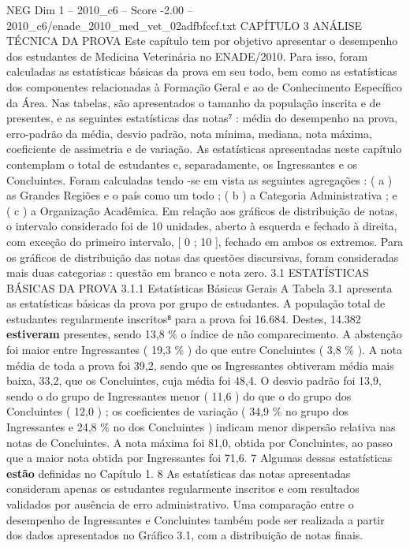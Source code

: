 \begin{textsample}{NEG Dim 1 – 2010\_c6 – Score -2.00 – 2010\_c6/enade\_2010\_med\_vet\_02adfbfccf.txt}  \label{ex:f1_neg_277}
CAPÍTULO 3 ANÁLISE TÉCNICA DA PROVA Este capítulo tem por objetivo apresentar o desempenho dos estudantes de Medicina Veterinária no ENADE/2010.
Para isso, foram calculadas as estatísticas básicas da prova em seu todo, bem como as estatísticas dos componentes relacionadas à Formação Geral e ao de Conhecimento Específico da Área.
Nas tabelas, são apresentados o tamanho da população inscrita e de presentes, e as seguintes estatísticas das notas⁷ : média do desempenho na prova, erro-padrão da média, desvio padrão, nota mínima, mediana, nota máxima, coeficiente de assimetria e de variação.
As estatísticas apresentadas neste capítulo contemplam o total de estudantes e, separadamente, os Ingressantes e os Concluintes.
Foram calculadas tendo -se em vista as seguintes agregações : ( a ) as Grandes Regiões e o país como um todo ; ( b ) a Categoria Administrativa ; e ( c ) a Organização Acadêmica.
Em relação aos gráficos de distribuição de notas, o intervalo considerado foi de 10 unidades, aberto à esquerda e fechado à direita, com exceção do primeiro intervalo, [ 0 ; 10 ], fechado em ambos os extremos.
Para os gráficos de distribuição das notas das questões discursivas, foram consideradas mais duas categorias : questão em branco e nota zero. 3.1 ESTATÍSTICAS BÁSICAS DA PROVA 3.1.1 Estatísticas Básicas Gerais A Tabela 3.1 apresenta as estatísticas básicas da prova por grupo de estudantes.
A população total de estudantes regularmente inscritos⁸ para a prova foi 16.684.
Destes, 14.382 \textbf{estiveram} presentes, sendo 13,8 \% o índice de não comparecimento.
A abstenção foi maior entre Ingressantes ( 19,3 \% ) do que entre Concluintes ( 3,8 \% ).
A nota média de toda a prova foi 39,2, sendo que os Ingressantes obtiveram média mais baixa, 33,2, que os Concluintes, cuja média foi 48,4.
O desvio padrão foi 13,9, sendo o do grupo de Ingressantes menor ( 11,6 ) do que o do grupo dos Concluintes ( 12,0 ) ; os coeficientes de variação ( 34,9 \% no grupo dos Ingressantes e 24,8 \% no dos Concluintes ) indicam menor dispersão relativa nas notas de Concluintes.
A nota máxima foi 81,0, obtida por Concluintes, ao passo que a maior nota obtida por Ingressantes foi 71,6. 7 Algumas dessas estatísticas \textbf{estão} definidas no Capítulo 1. 8 As estatísticas das notas apresentadas consideram apenas os estudantes regularmente inscritos e com resultados validados por ausência de erro administrativo.
Uma comparação entre o desempenho de Ingressantes e Concluintes também pode ser realizada a partir dos dados apresentados no Gráfico 3.1, com a distribuição de notas finais.

\end{textsample}
